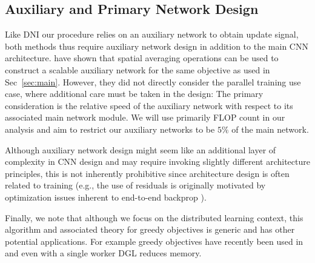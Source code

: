 \documentclass{article}
\begin{document}
\subsection{Auxiliary and Primary Network Design}\label{subsec:aux}

Like DNI our procedure relies on an auxiliary network to obtain update signal, both methods thus require auxiliary network design in addition to the main CNN architecture. \citet{shallow} have shown that spatial averaging operations can be used to construct a scalable auxiliary network for the same objective as used in Sec~\ref{sec:main}. However, they did not directly consider the parallel training use case, where additional care must be taken in the design: The primary consideration is the relative speed of the auxiliary network with respect to its associated main network module. We will use primarily FLOP count in our analysis and aim to restrict our auxiliary networks to be $5\%$ of the main network. 

Although auxiliary network design might seem like an additional layer of complexity in CNN design and may require invoking slightly different architecture principles, this is not inherently prohibitive since architecture design is often related to training (e.g., the use of residuals  is originally motivated by optimization issues inherent to end-to-end backprop \citep{he2016deep}). 

Finally, we note that although we focus on the distributed learning context, this algorithm and associated theory for greedy objectives is generic and has other potential applications. For example greedy objectives have recently been used in \citep{haarnoja18a,huang2017learning} and even with a single worker DGL reduces memory.%



\vspace{-2pt}
\end{document}
